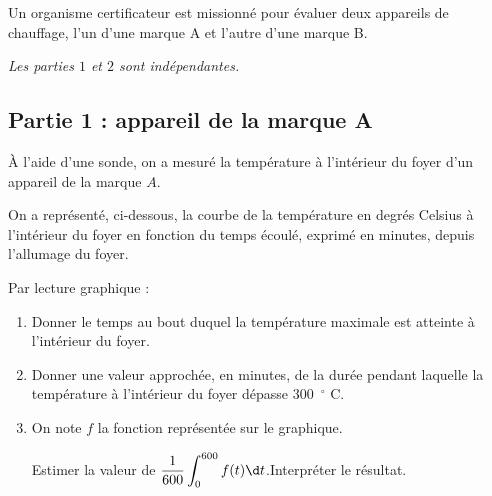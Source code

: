 Un organisme certificateur est missionné pour évaluer deux appareils de chauffage, l'un d'une marque A et l'autre d'une marque B.

\begin{center}
\textit{Les parties $1$ et $2$ sont indépendantes.}
\end{center}

\subsection*{Partie 1 : appareil de la marque A}

À l'aide d'une sonde, on a mesuré la température à l'intérieur du foyer d'un appareil de la marque $A$.

On a représenté, ci-dessous, la courbe de la température en degrés Celsius à l'intérieur du foyer en fonction du temps écoulé, exprimé en minutes, depuis l'allumage du foyer.

\begin{center}
\end{center}

Par lecture graphique :

\begin{enumerate}
	\item Donner le temps au bout duquel la température maximale est atteinte à l'intérieur du foyer.
	\item Donner une valeur approchée, en minutes, de la durée pendant laquelle la température à l'intérieur du foyer dépasse $300$~\ensuremath{^\circ} C.
	\item On note $f$ la fonction représentée sur le graphique.

	Estimer la valeur de \quad $\displaystyle\dfrac{1}{600} \int_{0}^{600} f(t) \d t$.\quad Interpréter le résultat.
\end{enumerate}

